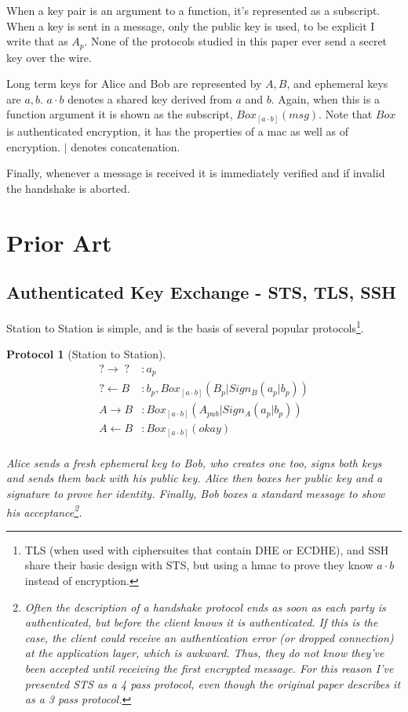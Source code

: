 \documentclass[12pt]{article}
\newtheorem{proto}{Protocol}
\begin{document}
When a key pair is an argument to a function,
it's represented as a subscript. When a key is sent in a message,
only the public key is used, to be explicit I write that as $A_{p}$.
None of the protocols studied in this paper ever send a secret key
over the wire.

Long term keys for Alice and Bob are represented by $A,B$,
and ephemeral keys are $a,b$. $a \cdot b$ denotes a shared key derived
from $a$ and $b$. Again, when this is a function argument it is shown
as the subscript, $Box_{[a\cdot b]}(msg)$. Note that
$Box$ is authenticated encryption, it has the
properties of a mac as well as of encryption. $|$ denotes concatenation.

Finally, whenever a message is received it is immediately verified
and if invalid the handshake is aborted.

\section{Prior Art}

\subsection{Authenticated Key Exchange - STS, TLS, SSH}

Station to Station\cite{aake} is simple, and is the basis of several
popular protocols\footnote{
  TLS (when used with ciphersuites that contain DHE or ECDHE),
  and SSH share their basic design with STS, but using
  a hmac to prove they know $a\cdot b$ instead of encryption.
}.

\begin{samepage}
\begin{proto}[Station to Station]

  $$
  \begin{align*}
      ? \to \;?\;   &: a_{p} \\
      ? \gets B &: b_{p}, Box_{[a\cdot b]}(B_p | Sign_B(a_{p}|b_{p})) \\
      A \to B   &: Box_{[a\cdot b]}(A_{pub} | Sign_A(a_{p} | b_{p})) \\
      A \gets B &: Box_{[a\cdot b]}(okay) \\
  \end{align*}
  $$

  Alice sends a fresh ephemeral key to Bob, who creates one too,
  signs both keys and sends them back with his public key.
  Alice then boxes her public key and a signature to prove her identity.
  Finally, Bob boxes a standard message to show his acceptance\footnote{
    Often the description of a handshake protocol ends as soon
    as each party is authenticated, but before the client \emph{knows}
    it is authenticated. If this is the case, the client  could receive
    an authentication error (or dropped connection) at the application
    layer, which is awkward. Thus, they do not know they've been accepted
    until receiving the first encrypted message. For this reason
    I've presented STS as a 4 pass protocol, even though the original
    paper describes it as a 3 pass protocol.
  }.

\end{proto}
\end{samepage}
\end{document}
